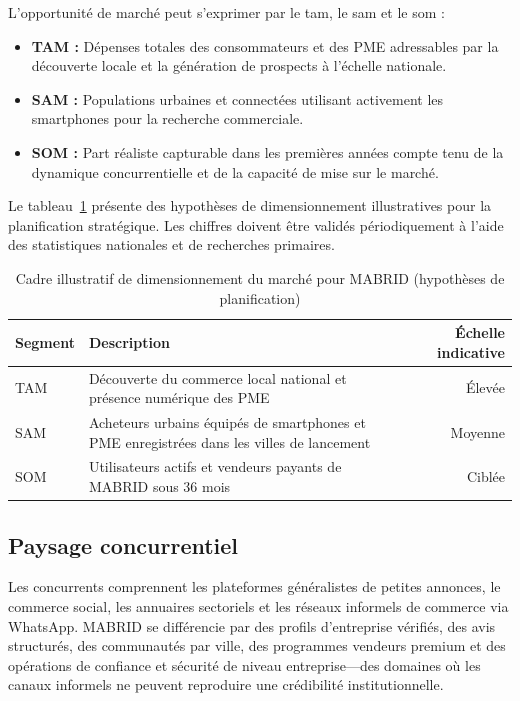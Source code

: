 L'opportunité de marché peut s'exprimer par le \gls{tam}, le \gls{sam} et le \gls{som} \parencite{osterwalder2010business} :
\begin{itemize}
  \item \textbf{TAM :} Dépenses totales des consommateurs et des PME adressables par la découverte locale et la génération de prospects à l'échelle nationale.
  \item \textbf{SAM :} Populations urbaines et connectées utilisant activement les smartphones pour la recherche commerciale.
  \item \textbf{SOM :} Part réaliste capturable dans les premières années compte tenu de la dynamique concurrentielle et de la capacité de mise sur le marché.
\end{itemize}

Le tableau~\ref{tab:market-sizing} présente des hypothèses de dimensionnement illustratives pour la planification stratégique. Les chiffres doivent être validés périodiquement à l'aide des statistiques nationales et de recherches primaires.

\begin{table}[H]
  \centering
  \caption{Cadre illustratif de dimensionnement du marché pour MABRID (hypothèses de planification)}
  \label{tab:market-sizing}
  \begin{tabularx}{\textwidth}{@{}lXr@{}}
    \toprule
    \textbf{Segment} & \textbf{Description} & \textbf{Échelle indicative} \\
    \midrule
  TAM & Découverte du commerce local national et présence numérique des PME & Élevée \\
  SAM & Acheteurs urbains équipés de smartphones et PME enregistrées dans les villes de lancement & Moyenne \\
  SOM & Utilisateurs actifs et vendeurs payants de MABRID sous 36 mois & Ciblée \\
    \bottomrule
  \end{tabularx}
\end{table}

\subsection{Paysage concurrentiel}

Les concurrents comprennent les plateformes généralistes de petites annonces, le commerce social, les annuaires sectoriels et les réseaux informels de commerce via WhatsApp. MABRID se différencie par des profils d'entreprise vérifiés, des avis structurés, des communautés par ville, des programmes vendeurs premium et des opérations de confiance et sécurité de niveau entreprise---des domaines où les canaux informels ne peuvent reproduire une crédibilité institutionnelle.

